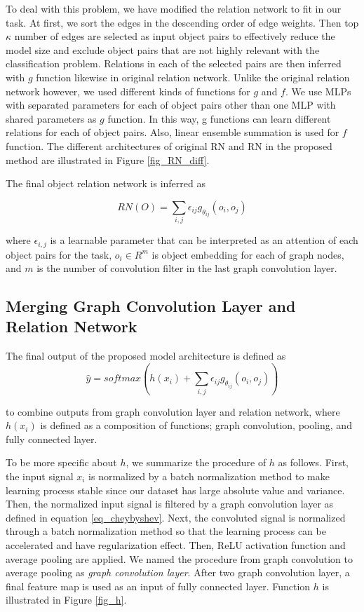 \documentclass{article}
\begin{document}
To deal with this problem, we have modified the relation network to fit in our task. At first, we sort the edges in the descending order of edge weights. Then top $\kappa$ number of edges are selected as input object pairs to effectively reduce the model size and exclude object pairs that are not highly relevant with the classification problem. Relations in each of the selected pairs are then inferred with $g$ function likewise in original relation network. Unlike the original relation network however, we used different kinds of functions for $g$ and $f$. We use MLPs with separated parameters for each of object pairs other than one MLP with shared parameters as $g$ function. In this way, g functions can learn different relations for each of object pairs. Also, linear ensemble summation is used for $f$ function. The different architectures of original RN and RN in the proposed method are illustrated in Figure \ref{fig_RN_diff}.

The final object relation network is inferred as 

\begin{equation}
\label{eq_brca_RN}
RN(O) = \sum_{i,j} \epsilon_{ij}g_{\theta_{ij}}(o_i, o_j)
\end{equation}

\noindent where $\epsilon_{i,j}$ is a learnable parameter that can be interpreted as an attention of each object pairs for the task, $o_i \in R^m$ is object embedding for each of graph nodes, and $m$ is the number of convolution filter in the last graph convolution layer.

\subsection{Merging Graph Convolution Layer and Relation Network}
The final output of the proposed model architecture is defined as 
\begin{equation}
\label{eq_network_output}
\hat{y} = softmax(h(x_i) + \sum_{i,j} \epsilon_{ij}g_{\theta_{ij}}(o_i, o_j))
\end{equation}

\noindent to combine outputs from graph convolution layer and relation network, where $h(x_i)$ is defined as a composition of functions; graph convolution, pooling, and fully connected layer.

To be more specific about $h$, we summarize the procedure of $h$ as follows. First, the input signal $x_i$ is normalized by a batch normalization method \cite{ioffe2015batch} to make learning process stable since our dataset has large absolute value and variance. 
Then, the normalized input signal is filtered by a graph convolution layer as defined in equation \ref{eq_cheybyshev}. Next, the convoluted signal is normalized through a batch normalization method so that the learning process can be accelerated and have regularization effect.
Then, ReLU activation function and average pooling are applied. 
We named the procedure from graph convolution to average pooling as \textit{graph convolution layer}.
After two graph convolution layer, a final feature map is used as an input of fully connected layer. Function $h$ is illustrated in Figure \ref{fig_h}.
\end{document}
